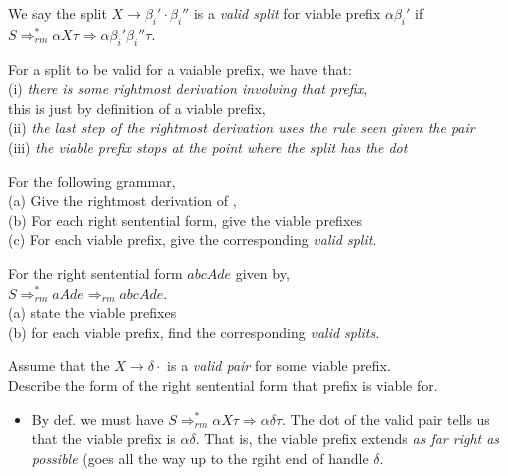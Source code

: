 We say the split $X \rightarrow \beta_{i}' \cdot \beta_{i}''$ is a \textit{valid split} for viable prefix $\alpha\beta_{i}'$ 
if $S \Rightarrow^{*}_{rm} \alpha X \tau \Rightarrow \alpha \beta_{i}' \beta_{i}'' \tau$.

For a split to be valid for a vaiable prefix, we have that:\\
(i) \textit{there is some rightmost derivation involving that prefix}, \\
this is just by definition of a viable prefix, \\
(ii) \textit{the last step of the rightmost derivation uses the rule seen given the pair} \\
(iii) \textit{the viable prefix stops at the point where the split has the dot}

\frmrule 

\begin{example}
For the following grammar, \\
(a) Give the rightmost derivation of ,\\
(b) For each right sentential form, give the viable prefixes\\
(c) For each viable prefix, give the corresponding \textit{valid split}.
\end{example}

\frmrule 

\begin{example}
For the right sentential form $abcAde$ given by, \\
$S \Rightarrow^{*}_{rm} aAde \Rightarrow_{rm} abcAde$. \\
(a) state the viable prefixes \\
(b) for each viable prefix, find the corresponding \textit{valid splits}.
\end{example}

\frmrule 

\begin{example}
Assume that the $X \rightarrow \delta \cdot$ is a \textit{valid pair} for some viable prefix. \\
Describe the form of the right sentential form that prefix is viable for. 

\begin{itemize}
\item By def. we must have $S \Rightarrow^{*}_{rm} \alpha X \tau \Rightarrow \alpha \delta \tau$. 
The dot of the valid pair tells us that the viable prefix is $\alpha \delta$. That is, the viable prefix 
extends \textit{as far right as possible} (goes all the way up to the rgiht end of handle $\delta$.
\end{itemize}
\end{example}

